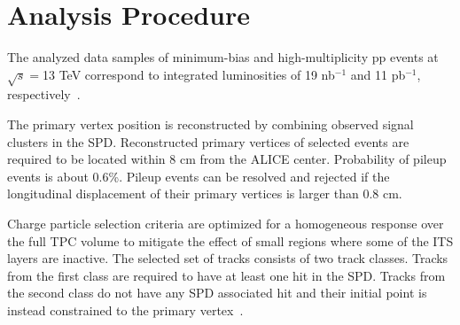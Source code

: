 \section{Analysis Procedure}
\label{sec:ana}

The analyzed data samples of minimum-bias and high-multiplicity pp events at $\sqrt{s}=$13 TeV correspond to integrated luminosities of 19 nb$^{-1}$ and 11 pb$^{-1}$, respectively~\cite{ALICE-PUBLIC-2016-002}.

The primary vertex position is reconstructed by combining observed signal clusters in the SPD. Reconstructed primary vertices of selected events are required to be located within 8 cm from the ALICE center. Probability of pileup events is about 0.6\%. Pileup events can be resolved and rejected if the longitudinal displacement of their primary vertices is larger than 0.8 cm.

Charge particle selection criteria are optimized for a homogeneous response over the full TPC volume to mitigate the effect of small regions where some of the ITS layers are inactive. The selected set of tracks consists of two track classes. Tracks from the first class are required to have at least one hit in the SPD. Tracks from the second class do not have any SPD associated hit and their initial point is instead constrained to the primary vertex~\cite{20151:HybridTracks}.

